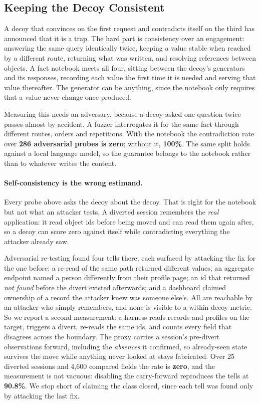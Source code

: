 \documentclass[runningheads]{llncs}
\begin{document}
\subsection{Keeping the Decoy Consistent}
\label{sec:consistency}

A decoy that convinces on the first request and contradicts itself on the third has
announced that it is a trap. The hard part is consistency over an engagement:
answering the same query identically twice, keeping a value stable when reached by a
different route, returning what was written, and resolving references between
objects. A fact notebook meets all four, sitting between the decoy's generators and
its responses, recording each value the first time it is needed and serving that
value thereafter. The generator can be anything, since the notebook only requires
that a value never change once produced.

Measuring this needs an adversary, because a decoy asked one question twice passes
almost by accident. A fuzzer interrogates it for the same fact through different
routes, orders and repetitions. With the notebook the contradiction rate over
\textbf{286 adversarial probes is zero}; without it, \textbf{100\%}. The same split
holds against a local language model, so the guarantee belongs to the notebook
rather than to whatever writes the content.

\paragraph{Self-consistency is the wrong estimand.}
Every probe above asks the decoy about the decoy. That is right for the notebook but
not what an attacker tests. A diverted session remembers the \emph{real}
application: it read object ids before being moved and can read them again after, so
a decoy can score zero against itself while contradicting everything the attacker
already saw.

Adversarial re-testing found four tells there, each surfaced by attacking the fix for
the one before: a re-read of the same path returned different values; an aggregate
endpoint named a person differently from their profile page; an id that returned
\emph{not found} before the divert existed afterwards; and a dashboard claimed
ownership of a record the attacker knew was someone else's. All are reachable by an
attacker who simply remembers, and none is visible to a within-decoy metric. So we
report a second measurement: a harness reads records and profiles on the target,
triggers a divert, re-reads the same ids, and counts every field that disagrees
across the boundary. The proxy carries a session's pre-divert observations forward,
including the \emph{absences} it confirmed, so already-seen state survives the move
while anything never looked at stays fabricated. Over 25 diverted sessions and 4,600
compared fields the rate is \textbf{zero}, and the measurement is not vacuous:
disabling the carry-forward reproduces the tells at \textbf{90.8\%}. We stop short of
claiming the class closed, since each tell was found only by attacking the last fix.
\end{document}
